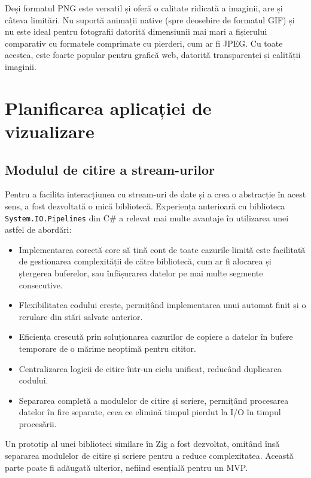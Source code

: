\documentclass[a4paper,12pt]{report}
\begin{document}
Deși formatul \ac{PNG} este versatil și oferă o calitate ridicată a imaginii, are și câteva limitări.
Nu suportă animații native (spre deosebire de formatul \ac{GIF})
și nu este ideal pentru fotografii datorită dimensiunii mai mari a fișierului comparativ
cu formatele comprimate cu pierderi, cum ar fi \ac{JPEG}.
Cu toate acestea, este foarte popular pentru grafică web,
datorită transparenței și calității imaginii.


\section{Planificarea aplicației de vizualizare}

\subsection{Modulul de citire a stream-urilor}

Pentru a facilita interacțiunea cu stream-uri de date și a crea o abstracție în acest sens,
a fost dezvoltată o mică bibliotecă.
Experiența anterioară cu biblioteca \texttt{System.IO.Pipelines}\cite{system_io_pipelines}
din C\# a relevat mai multe avantaje în utilizarea unei astfel de abordări:
\begin{itemize}
  \item
  Implementarea corectă core să țină cont de toate cazurile-limită
  este facilitată de gestionarea complexității de către
  bibliotecă, cum ar fi alocarea și ștergerea buferelor,
  sau înfășurarea datelor pe mai multe segmente consecutive.

  \item
  Flexibilitatea codului crește, permițând implementarea unui automat finit
  și o rerulare din stări salvate anterior.

  \item
  Eficiența crescută prin soluționarea cazurilor de copiere a datelor în bufere temporare
  de o mărime neoptimă pentru cititor.

  \item
  Centralizarea logicii de citire într-un ciclu unificat,
  reducând duplicarea codului.

  \item
  Separarea completă a modulelor de citire și scriere,
  permițând procesarea datelor în fire separate,
  ceea ce elimină timpul pierdut la \ac{I/O} în timpul procesării.
\end{itemize}

Un prototip al unei biblioteci similare în Zig a fost dezvoltat,
omitând însă separarea modulelor de citire și scriere pentru a reduce complexitatea.
Această parte poate fi adăugată ulterior, nefiind esențială pentru un \ac{MVP}.
\end{document}
